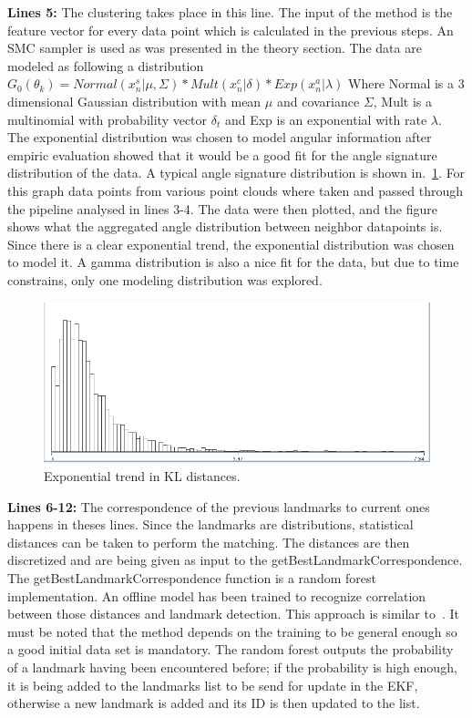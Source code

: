 \documentclass[twoside,hidelinks]{article}
\begin{document}
\textbf{Lines 5:} The clustering takes place in this line. The input of the method is the feature vector for every data point which is calculated in the previous steps. An SMC sampler is used as was presented in the theory section. The data are modeled as following a distribution $G_0(\theta_k) = Normal(x_n^s | \mu , \Sigma)* Mult(x_n^c| \delta) * Exp( x_n^a | \lambda) $ Where Normal is a 3 dimensional Gaussian distribution with mean $\mu$ and covariance $\Sigma$, Mult is a multinomial with probability vector $\delta_t$ and Exp is an exponential with rate $\lambda$. The exponential distribution was chosen to model angular information after empiric evaluation showed that it would be a good fit for the angle signature distribution of the data. A typical angle signature distribution is shown in.~\ref{pcl:kl}. For this graph data points from various point clouds where taken and passed through the pipeline analysed in lines 3-4. The data were then plotted, and the figure shows what the aggregated angle distribution between neighbor datapoints is. Since there is a clear exponential trend, the exponential distribution was chosen to model it. A gamma distribution is also a nice fit for the data, but due to time constrains, only one modeling    distribution was explored.

\begin{figure}[h!]
  \centering
    \includegraphics[width=1\textwidth]{Kullback-Leibler}
    \caption{Exponential trend in KL distances.}
  \label{pcl:kl}
\end{figure}


\textbf{Lines 6-12:} The correspondence of the previous landmarks to current ones happens in theses lines. Since the landmarks are distributions, statistical distances can be taken to perform the matching. The distances are then discretized and are being given as input to the getBestLandmarkCorrespondence. The getBestLandmarkCorrespondence function is a random forest implementation. An offline model has been trained to recognize correlation between those distances and landmark detection. This approach is similar to~\cite{objectDisc}. It must be noted that the method depends on the training to be general enough so a good initial data set is mandatory. The random forest outputs the probability of a landmark having been encountered before; if the probability is high enough, it is being added to the landmarks list to be send for update in the EKF, otherwise a new landmark is added and its ID is then updated to the list.
\end{document}
